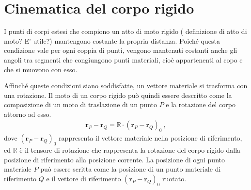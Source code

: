 \documentclass[letterpaper,10pt,english]{jupyterBook}
\begin{document}
\section{Cinematica del corpo rigido}
\label{\detokenize{ch/kinematics-rigid:cinematica-del-corpo-rigido}}\label{\detokenize{ch/kinematics-rigid:classical-mechanics-kinematics-rigid-body}}\label{\detokenize{ch/kinematics-rigid::doc}}
\sphinxAtStartPar
I punti di corpi estesi che compiono un atto di moto rigido ( definizione di atto di moto? E’ utile?) mantengono costante la propria distanza. Poiché questa condizione vale per ogni coppia di punti, vengono mantenuti costanti anche gli angoli tra segmenti che congiungono punti materiali, cioè appartenenti al copo e che si muovono con esso.

\sphinxAtStartPar
Affinché queste condizioni siano soddisfatte, un vettore materiale si trasforma con una rotazione. Il moto di un corpo rigido può quindi essere descritto come la composizione di un moto di traslazione di un punto \(P\) e la rotazione del corpo attorno ad esso.
\begin{equation*}
\begin{split}\mathbf{r}_P - \mathbf{r}_Q = \mathbb{R} \cdot (\mathbf{r}_P - \mathbf{r}_Q)_0 \ ,\end{split}
\end{equation*}
\sphinxAtStartPar
dove \((\mathbf{r}_P - \mathbf{r}_Q)_0\) rappresenta il vettore materiale nella posizione di riferimento, ed \(\mathbb{R}\) è il tensore di rotazione che rappresenta la rotazione del corpo rigido dalla posizione di riferimento alla posizione corrente. La posizione di ogni punto materiale \(P\) può essere scritta come la posizione di un punto materiale di riferimento \(Q\) e il vettore di riferimento \((\mathbf{r}_P - \mathbf{r}_Q)_0\) ruotato.
\end{document}
